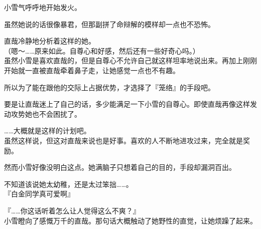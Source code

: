 小雪气呼呼地开始发火。

虽然她说的话很像暴君，但那副拼了命辩解的模样却一点也不恐怖。

直哉冷静地分析着这样的她。\\

（嗯～……原来如此。自尊心和好感，然后还有一些好奇心吗。）\\

虽然小雪是喜欢直哉的，但是自尊心不允许自己就这样坦率地说出来。再加上刚刚开始就一直被直哉牵着鼻子走，让她感觉一点也不有趣。

所以为了能在跟他的交际上占据优势，才选择了『笼络』的手段吧。

要是让直哉迷上了自己的话，多少能满足一下小雪的自尊心。即使直哉再像这样发动攻势她也不会困扰了。

……大概就是这样的计划吧。\\

虽然这样说，但这对直哉来说也是好事。喜欢的人不断地进攻过来，完全就是奖励。

然而小雪好像没明白这点。她满脑子只想着自己的目的，手段却漏洞百出。

不知道该说她太幼稚，还是太过笨拙……。\\

『白金同学真可爱啊』

『……你这话听着怎么让人觉得这么不爽？』\\

小雪瞪向了感慨万千的直哉。那句话大概触动了她野性的直觉，让她烦躁了起来。
